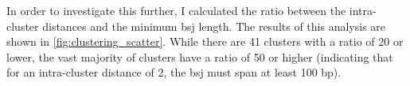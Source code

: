 In order to investigate this further, I calculated the ratio between the
intra-cluster distances and the minimum \gls{bsj} length.
The results of this analysis are shown in \cref{fig:clustering_scatter}.
While there are 41 clusters with a ratio of 20 or lower, the vast majority of
clusters have a ratio of 50 or higher (indicating that for an intra-cluster
distance of 2, the \gls{bsj} must span at least 100 bp).

